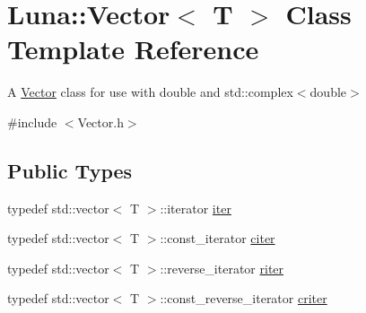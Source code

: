 \hypertarget{classLuna_1_1Vector}{}\section{Luna\+:\+:Vector$<$ T $>$ Class Template Reference}
\label{classLuna_1_1Vector}


A \hyperlink{classLuna_1_1Vector}{Vector} class for use with double and std\+::complex$<$double$>$  




{\ttfamily \#include $<$Vector.\+h$>$}

\subsection*{Public Types}
\begin{DoxyCompactItemize}
\item 
typedef std\+::vector$<$ T $>$\+::iterator \hyperlink{classLuna_1_1Vector_aa6c4164f0cd114da31acfde53a36d65e}{iter}
\item 
typedef std\+::vector$<$ T $>$\+::const\+\_\+iterator \hyperlink{classLuna_1_1Vector_a90cff5eab2782bc1c6aaa879ce18a2b8}{citer}
\item 
typedef std\+::vector$<$ T $>$\+::reverse\+\_\+iterator \hyperlink{classLuna_1_1Vector_a6db6c6b09df2c68bbfd1960c56bb20d5}{riter}
\item 
typedef std\+::vector$<$ T $>$\+::const\+\_\+reverse\+\_\+iterator \hyperlink{classLuna_1_1Vector_a66e997f05169640055703449672be075}{criter}
\end{DoxyCompactItemize}
